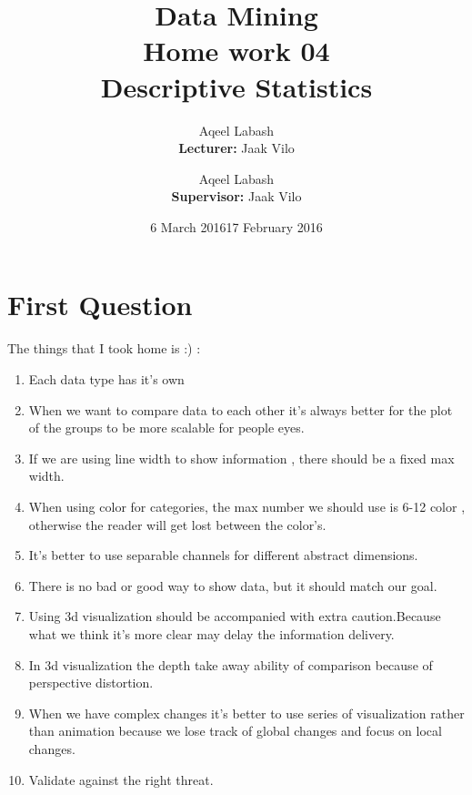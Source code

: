 \documentclass{article}
\title{Data Mining\\
		Home work 04\\Descriptive Statistics}
\author{Aqeel Labash\\ \textbf{Lecturer:} Jaak Vilo}
\date{6 March 2016}
\author{Aqeel Labash\\ \textbf{Supervisor:} Jaak Vilo}
\date{17 February 2016}
\begin{document}
	\maketitle
	\section*{First Question}
	The things that I took home is :) :
	\begin{enumerate}
\item  Each data type has it's own
\item When we want to compare data to each other it's always better for the plot of the groups to be more scalable for people eyes.
\item If we are using line width to show information , there should be a fixed max width.
\item When using color for categories, the max number we should use is 6-12 color , otherwise the reader will get lost between the color's.
\item It's better to use separable channels for different abstract dimensions.
\item There is no bad or good way to show data, but it should match our goal.
\item Using 3d visualization should be accompanied with extra caution.Because what we think it's more clear may delay the information delivery.
\item In 3d visualization the depth take away ability of comparison because of perspective distortion.
\item When we have complex changes it's better to use series of visualization rather than animation because we lose track of global changes and focus on local changes.
\item Validate against the right threat.
	\end{enumerate}
\end{document}
